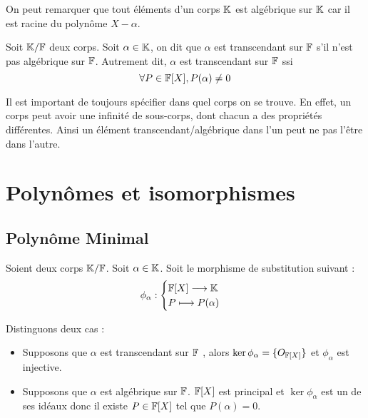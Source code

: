 On peut remarquer que tout éléments d'un corps $\mathbb{K}$ est algébrique sur $\mathbb{K}$ car il est racine du polynôme $X - \alpha$. 

\newpage 

\begin{definition}
    Soit $\mathbb{K}/\mathbb{F}$ deux corps. Soit $\alpha \in \mathbb{K}$, on dit que $\alpha$ est transcendant sur $\mathbb{F}$ s'il n'est pas algébrique sur $\mathbb{F}$. 
    Autrement dit, $\alpha$ est transcendant sur $\mathbb{F}$ ssi 
        \[ \forall P \in \mathbb{F}[X], P(\alpha) \not = 0 \] 
\end{definition}

Il est important de toujours spécifier dans quel corps on se trouve. En effet, un corps peut avoir une infinité de sous-corps, 
dont chacun a des propriétés différentes. Ainsi un élément transcendant/algébrique dans l'un peut ne pas l'être dans l'autre. 


\section{Polynômes et isomorphismes}

\subsection{Polynôme Minimal}

Soient deux corps $\mathbb{K}/\mathbb{F}$. Soit $ \alpha \in \mathbb{K}$. Soit le morphisme de substitution suivant :
    \[ \phi_\alpha : 
        \begin{cases}
            \mathbb{F}[X] \longrightarrow \mathbb{K} \\ 
            P \longmapsto P( \alpha)
        \end{cases} \]

Distinguons deux cas :
\begin{itemize}
    \item Supposons que $ \alpha$ est transcendant sur $\mathbb{F}$ , alors $ \ker \phi_\alpha = \{O_{\mathbb{F}[X]}\}$ et $\phi_\alpha$ est injective. 
    \item Supposons que $ \alpha $ est algébrique sur $\mathbb{F}$. 
    $\mathbb{F}[X]$ est principal et $\ker \phi_\alpha$ est un de ses idéaux donc il existe $P \in \mathbb{F}[X]$ tel que $ P(\alpha) = 0 $. 
\end{itemize} 

